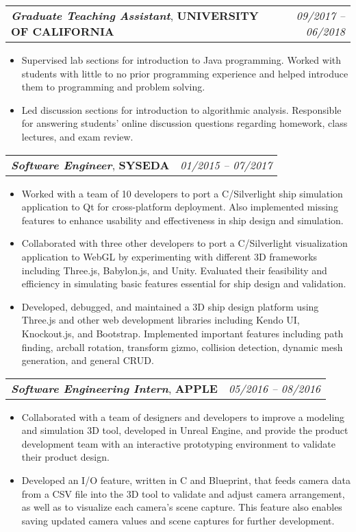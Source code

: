 \documentclass[letterpaper,11pt]{article}
\makeatletter
\newcommand{\resumeItem}[1]{
  \item \small{#1}
}
\newcommand{\resumeExperienceSubheading}[3]{
  \vspace{-1pt}\item
    \begin{tabular*}{0.97\textwidth}[t]{l@{\extracolsep{\fill}}r}
      \textbf{\textit{#1}}, \textbf{#2} & \textit{#3} \\
    \end{tabular*}\vspace{-5pt}
}
\newcommand{\resumeItemListStart}{\begin{itemize}}
\newcommand{\resumeItemListEnd}{\end{itemize}\vspace{-5pt}}
\def\CPlusPlus{{C\nolinebreak[4]\hspace{-.05em}\raisebox{.4ex}{\tiny\bf ++}}}
\def\CSharp{{C\nolinebreak[4]\hspace{-.05em}\raisebox{.4ex}{\tiny\bf \#}}}
\makeatother
\begin{document}
    \resumeExperienceSubheading
      {Graduate Teaching Assistant}{UNIVERSITY OF CALIFORNIA}{09/2017 -- 06/2018}
      \resumeItemListStart
        \resumeItem
          {Supervised lab sections for introduction to Java programming. Worked with students with little to no prior programming
          experience and helped introduce them to programming and problem solving.}
        \resumeItem
          {Led discussion sections for introduction to algorithmic analysis. Responsible for answering students' online discussion
          questions regarding homework, class lectures, and exam review.}
      \resumeItemListEnd

      \resumeExperienceSubheading
      {Software Engineer}{SYSEDA}{01/2015 -- 07/2017}
      \resumeItemListStart
        \resumeItem
          {Worked with a team of 10 developers to port a \CSharp/Silverlight ship simulation application to Qt for cross-platform deployment.
          Also implemented missing features to enhance usability and effectiveness in ship design and
          simulation.}
        \resumeItem
          {Collaborated with three other developers to port a \CSharp/Silverlight visualization application to WebGL by experimenting with
          different 3D frameworks including Three.js, Babylon.js, and Unity. Evaluated their feasibility and efficiency in simulating
          basic features essential for ship design and validation.}
        \resumeItem
          {Developed, debugged, and maintained a 3D ship design platform using Three.js and other web development libraries including Kendo UI,
          Knockout.js, and Bootstrap. Implemented important features including path finding, arcball rotation, transform gizmo, collision
          detection, dynamic mesh generation, and general CRUD.}
      \resumeItemListEnd

      \resumeExperienceSubheading
      {Software Engineering Intern}{APPLE}{05/2016 -- 08/2016}
      \resumeItemListStart
        \resumeItem
          {Collaborated with a team of designers and developers to improve a modeling and simulation 3D tool, developed in
          Unreal Engine, and provide the product development team with an interactive prototyping environment to validate their
          product design.}
        \resumeItem
          {Developed an I/O feature, written in {\CPlusPlus} and Blueprint, that feeds camera data from a CSV file into the 3D tool to
          validate and adjust camera arrangement, as well as to visualize each camera's scene capture. This feature also enables saving
          updated camera values and scene captures for further development.}
      \resumeItemListEnd
\end{document}
